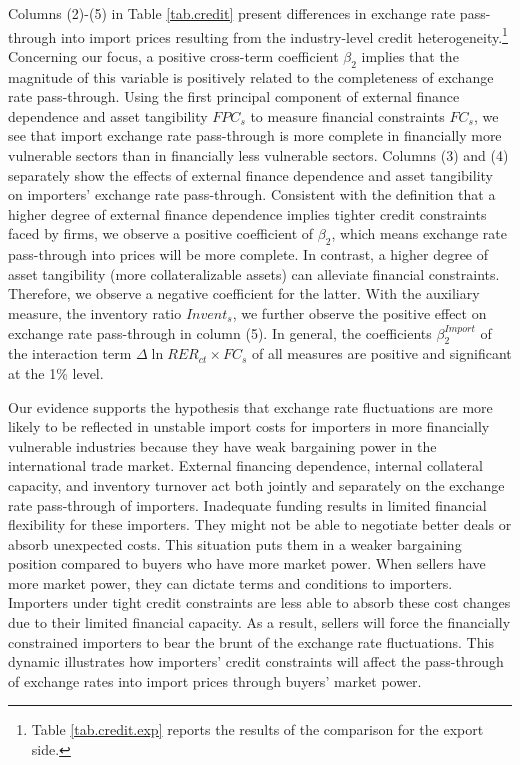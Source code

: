 Columns (2)-(5) in Table \ref{tab.credit} present differences in exchange rate pass-through into import prices resulting from the industry-level credit heterogeneity.\footnote{Table \ref{tab.credit.exp} reports the results of the comparison for the export side.} Concerning our focus, a positive cross-term coefficient $\beta_2$ implies that the magnitude of this variable is positively related to the completeness of exchange rate pass-through. Using the first principal component of external finance dependence and asset tangibility $FPC_{s}$ to measure financial constraints $FC_{s}$, we see that import exchange rate pass-through is more complete in financially more vulnerable sectors than in financially less vulnerable sectors. Columns (3) and (4) separately show the effects of external finance dependence and asset tangibility on importers' exchange rate pass-through. Consistent with the definition that a higher degree of external finance dependence implies tighter credit constraints faced by firms, we observe a positive coefficient of $\beta_2$, which means exchange rate pass-through into prices will be more complete. In contrast, a higher degree of asset tangibility (more collateralizable assets) can alleviate financial constraints. Therefore, we observe a negative coefficient for the latter. With the auxiliary measure, the inventory ratio $Invent_{s}$, we further observe the positive effect on exchange rate pass-through in column (5). In general, the coefficients $\beta^{Import}_2$ of the interaction term $\Delta \ln RER_{ct} \times FC_{s}$ of all measures are positive and significant at the 1\% level. 

Our evidence supports the hypothesis that exchange rate fluctuations are more likely to be reflected in unstable import costs for importers in more financially vulnerable industries because they have weak bargaining power in the international trade market. External financing dependence, internal collateral capacity, and inventory turnover act both jointly and separately on the exchange rate pass-through of importers. Inadequate funding results in limited financial flexibility for these importers. They might not be able to negotiate better deals or absorb unexpected costs. This situation puts them in a weaker bargaining position compared to buyers who have more market power. When sellers have more market power, they can dictate terms and conditions to importers. Importers under tight credit constraints are less able to absorb these cost changes due to their limited financial capacity. As a result, sellers will force the financially constrained importers to bear the brunt of the exchange rate fluctuations. This dynamic illustrates how importers' credit constraints will affect the pass-through of exchange rates into import prices through buyers' market power.

